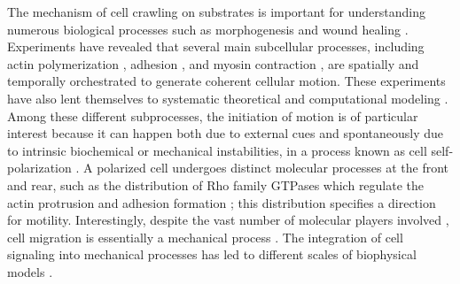 \documentclass[12pt]{article}
\begin{document}
The mechanism of cell crawling on substrates is important for understanding numerous biological processes such as morphogenesis and wound healing \cite{holt2021spatiotemporal}.
Experiments have revealed that several main subcellular processes, including actin polymerization \cite{pollard2003cellular}, adhesion \cite{ananthakrishnan2007forces}, and myosin contraction \cite{yam2007actin}, are spatially and temporally orchestrated to generate coherent cellular motion. 
These experiments have also lent themselves to systematic theoretical and computational modeling \cite{mogilner2020experiment}. 
Among these different subprocesses, the initiation of motion is of particular interest because it can happen both due to external cues and spontaneously due to intrinsic biochemical or mechanical instabilities, in a process known as cell self-polarization \cite{cramer2010forming,rappel2017mechanisms}. 
A polarized cell undergoes distinct molecular processes at the front and rear, such as the distribution of Rho family GTPases which regulate the actin protrusion and adhesion formation \cite{ridley2003cell}; this distribution specifies a direction for motility. 
Interestingly, despite the vast number of molecular players involved \cite{ridley2003cell,parsons2010cell}, cell migration is essentially a mechanical process \cite{sens2020stick,rangamani2011}. 
The integration of cell signaling into mechanical processes has led to different scales of biophysical models \cite{danuser2013mathematical,rangamani2011,Xiong2010}. 
\end{document}
